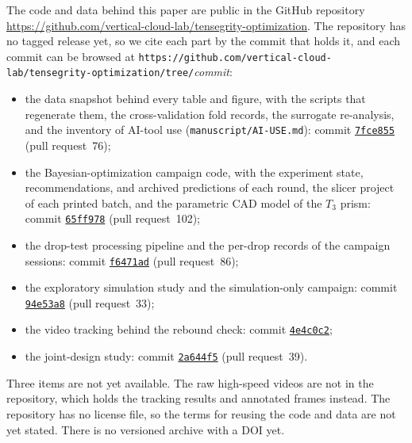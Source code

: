 \documentclass[11pt]{article}
\newcommand{\repo}{https://github.com/vertical-cloud-lab/tensegrity-optimization}
\begin{document}
The code and data behind this paper are public in the GitHub repository
\url{\repo}. The repository has no tagged release yet, so we cite each
part by the commit that holds it, and each commit can be browsed at
\texttt{\repo/tree/}\textit{commit}:
\begin{itemize}
  \item the data snapshot behind every table and figure, with the scripts
    that regenerate them, the cross-validation fold records, the surrogate
    re-analysis, and the inventory of AI-tool use
    (\texttt{manuscript/AI-USE.md}): commit
    \href{\repo/tree/7fce855563f6aa372911d6562cbebe8124553ea3}{\texttt{7fce855}}
    (pull request~76);
  \item the Bayesian-optimization campaign code, with the experiment
    state, recommendations, and archived predictions of each round, the
    slicer project of each printed batch, and the parametric CAD model of
    the $T_3$ prism: commit
    \href{\repo/tree/65ff9788a363025746463a463f10d3da7456ac11}{\texttt{65ff978}}
    (pull request~102);
  \item the drop-test processing pipeline and the per-drop records of the
    campaign sessions: commit
    \href{\repo/tree/f6471adb34cb5f2d0eba571d5005f4e250241fec}{\texttt{f6471ad}}
    (pull request~86);
  \item the exploratory simulation study and the simulation-only campaign:
    commit
    \href{\repo/tree/94e53a8efa331bb53855f971d998d95e5ef89b14}{\texttt{94e53a8}}
    (pull request~33);
  \item the video tracking behind the rebound check: commit
    \href{\repo/tree/4e4c0c2405dce793bcc53369c896ac078fa957f8}{\texttt{4e4c0c2}};
  \item the joint-design study: commit
    \href{\repo/tree/2a644f5844d9fe9460a2bcf641ca5e99e0fe3666}{\texttt{2a644f5}}
    (pull request~39).
\end{itemize}
Three items are not yet available. The raw high-speed videos are not in
the repository, which holds the tracking results and annotated frames
instead. The repository has no license file, so the terms for reusing
the code and data are not yet stated. There is no versioned archive with
a DOI yet.
\end{document}
